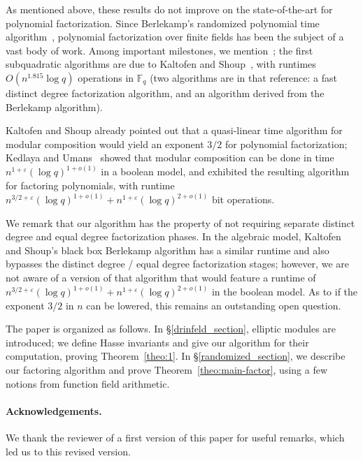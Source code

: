 \documentclass[12pt]{article}
\def\F{\ensuremath{\mathbb{F}}}
\begin{document}
As mentioned above, these results do not improve on the
state-of-the-art for polynomial factorization.
Since Berlekamp's randomized polynomial time algorithm~\cite{ber},
polynomial factorization over finite fields has been the subject of a
vast body of work. Among important milestones, we
mention~\cite{cz,gs}; the first subquadratic algorithms are due to
Kaltofen and Shoup~\cite{ks}, with runtimes $O(n^{1.815}\log q)$
operations in $\F_q$  (two algorithms are in that reference:
a fast distinct degree factorization algorithm, and an algorithm
derived from the Berlekamp algorithm).

Kaltofen and Shoup already pointed out that a quasi-linear time
algorithm for modular composition would yield an exponent $3/2$ for
polynomial factorization; Kedlaya and Umans~\cite{ku} showed that
modular composition can be done in time $n^{1+\varepsilon} (\log
q)^{1+o(1)}$ in a boolean model, and exhibited the resulting
algorithm for factoring polynomials, with runtime $n^{3/2+\varepsilon}
(\log q)^{1 +o(1)} + n^{1+\varepsilon}(\log q)^{2+o(1)}$ bit
operations. 

We remark that our algorithm has the property of not requiring
separate distinct degree and equal degree factorization phases. In the
algebraic model, Kaltofen and Shoup's black box Berlekamp algorithm
has a similar runtime and also bypasses the distinct degree / equal
degree factorization stages; however, we are not aware of a version of
that algorithm that would feature a runtime of $n^{3/2+\varepsilon} (\log q)^{1 +o(1)} +
n^{1+\varepsilon}(\log q)^{2+o(1)}$ in the boolean model.
As to if the exponent $3/2$ in $n$ can be lowered, this remains an
outstanding open question.


The paper is organized as follows. In \S\ref{drinfeld_section},
elliptic modules are introduced; we define Hasse invariants and give
our algorithm for their computation, proving Theorem~\ref{theo:1}.  In
\S\ref{randomized_section}, we describe our factoring algorithm and
prove Theorem~\ref{theo:main-factor}, using a few notions from
function field arithmetic.

 \paragraph*{Acknowledgements.} We thank the reviewer of a first version
of this paper for useful remarks, which led us to this revised version. 


\end{document}
